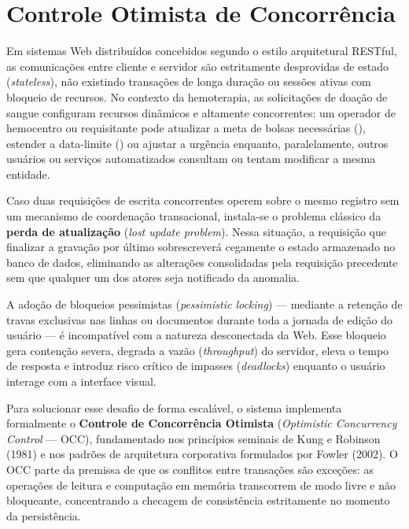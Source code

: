 \section{Controle Otimista de Concorrência}
\label{sec:controle-otimista-concorrencia}

Em sistemas Web distribuídos concebidos segundo o estilo arquitetural RESTful, as comunicações entre cliente e servidor são estritamente desprovidas de estado (\textit{stateless}), não existindo transações de longa duração ou sessões ativas com bloqueio de recursos. No contexto da hemoterapia, as solicitações de doação de sangue configuram recursos dinâmicos e altamente concorrentes: um operador de hemocentro ou requisitante pode atualizar a meta de bolsas necessárias (), estender a data-limite () ou ajustar a urgência enquanto, paralelamente, outros usuários ou serviços automatizados consultam ou tentam modificar a mesma entidade.

Caso duas requisições de escrita concorrentes operem sobre o mesmo registro sem um mecanismo de coordenação transacional, instala-se o problema clássico da \textbf{perda de atualização} (\textit{lost update problem}). Nessa situação, a requisição que finalizar a gravação por último sobrescreverá cegamente o estado armazenado no banco de dados, eliminando as alterações consolidadas pela requisição precedente sem que qualquer um dos atores seja notificado da anomalia.

A adoção de bloqueios pessimistas (\textit{pessimistic locking}) --- mediante a retenção de travas exclusivas nas linhas ou documentos durante toda a jornada de edição do usuário --- é incompatível com a natureza desconectada da Web. Esse bloqueio gera contenção severa, degrada a vazão (\textit{throughput}) do servidor, eleva o tempo de resposta e introduz risco crítico de impasses (\textit{deadlocks}) enquanto o usuário interage com a interface visual.

Para solucionar esse desafio de forma escalável, o sistema implementa formalmente o \textbf{Controle de Concorrência Otimista} (\textit{Optimistic Concurrency Control} --- OCC), fundamentado nos princípios seminais de Kung e Robinson (1981) e nos padrões de arquitetura corporativa formulados por Fowler (2002). O OCC parte da premissa de que os conflitos entre transações são exceções: as operações de leitura e computação em memória transcorrem de modo livre e não bloqueante, concentrando a checagem de consistência estritamente no momento da persistência.

